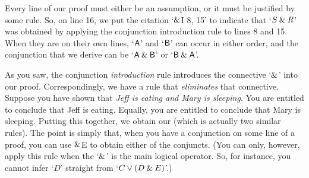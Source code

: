 Every line of our proof must either be an assumption, or it must be justified by some rule. So, on line 16, we put the citation `$\mathbin{\&}$I 8, 15' to indicate that `$S \mathbin{\&} R$' was obtained by applying the conjunction introduction rule to lines 8 and 15. When they are on their own lines, `$\mathsf{A}$' and `$\mathsf{B}$' can occur in either order, and the conjunction that we derive can be `$\mathsf{A} \mathbin{\&} \mathsf{B}$' or `$\mathsf{B} \mathbin{\&} \mathsf{A}$'.

As you saw, the conjunction \emph{introduction} rule introduces the connective `$\mathbin{\&}$' into our proof. Correspondingly, we have a rule that \emph{eliminates} that connective.  Suppose you have shown that \textit{Jeff is eating and Mary is sleeping}. You are entitled to conclude that Jeff is eating. Equally, you are entitled to conclude that Mary is sleeping. Putting this together, we obtain our  (which is actually two similar rules).
\factoidbox{
\begin{proof}
	\have[m]{ab}{\meta{A}\eand\meta{B}}
	\have[\ ]{a}{\meta{A}} \ae{ab}
\end{proof}
\textit{and equally:}
\begin{proof}
	\have[m]{ab}{\meta{A}\eand\meta{B}}
	\have[\ ]{b}{\meta{B}} \ae{ab}
\end{proof}}
\noindent The point is simply that, when you have a conjunction on some line of a proof, you can use $\mathbin{\&}$E to obtain either of the conjuncts. (You can only, however, apply this rule when the `$\mathbin{\&}$' is the main logical operator. So, for instance, you cannot infer `$D$' straight from `$C \vee (D \mathbin{\&} E)$'.)

